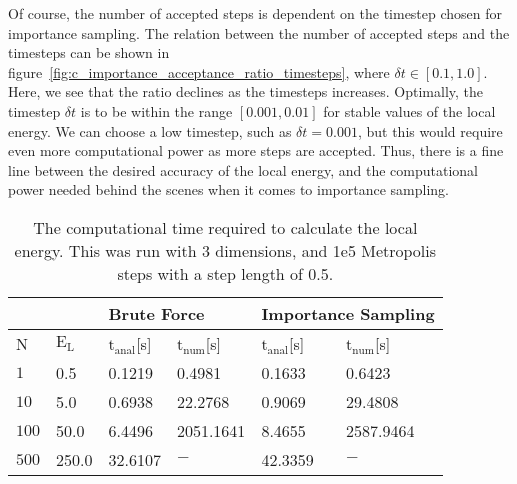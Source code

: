 \documentclass[
    a4paper, aps, twocolumn, floatfix, superscriptaddress,
    nofootinbib]{revtex4-1}
\begin{document}
Of course, the number of accepted steps is dependent on the timestep chosen for importance sampling. The relation between the number of accepted steps and the timesteps can be shown in figure~\ref{fig:c_importance_acceptance_ratio_timesteps}, where $\delta t \in [0.1, 1.0]$. Here, we see that the ratio declines as the timesteps increases. Optimally, the timestep $\delta t$ is to be within the range $[0.001, 0.01]$ for stable values of the local energy. We can choose a low timestep, such as $\delta t = 0.001$, but this would require even more computational power as more steps are accepted. Thus, there is a fine line between the desired accuracy of the local energy, and the computational power needed behind the scenes when it comes to importance sampling.


\begin{table}[h!]
 \caption{The computational time required to calculate the local energy. This was run with 3 dimensions, and 1e5 Metropolis steps with a step length of 0.5.}
 \begin{ruledtabular}
    \begin{tabular}{p{0.5cm}p{1.1cm}p{1.1cm}p{1.1cm}p{1.1cm}p{1.1cm}}
    \multirow{2}{*}{} &
     &
      \multicolumn{2}{l}{Brute Force} &
      \multicolumn{2}{l}{Importance Sampling} \\
    \hline
      N & $\text{E}_{\text{L}}$ & $\text{t}_{\text{anal}}$[\si{\second}] & $\text{t}_{\text{num}}$[\si{\second}]& $\text{t}_{\text{anal}}$[\si{\second}] & $\text{t}_{\text{num}}$[\si{\second}] \\
      \hline
 $1$& 0.5 &  0.1219   &  0.4981   & 0.1633  &  0.6423 \\
 $10$& 5.0 & 0.6938   &   22.2768  & 0.9069    &  29.4808 \\
 $100$& 50.0 &  6.4496  & 2051.1641 &   8.4655    &  2587.9464 \\
 $500$& 250.0 & 32.6107  & $ - $  & 42.3359 & $ - $\\
  \end{tabular}
  \end{ruledtabular}
  \label{tab:c_brute_force_vs_importance_tCPU}
\end{table}

\end{document}
